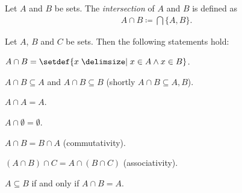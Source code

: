 \begin{definition}
    Let $A$ and $B$ be sets. The \emph{intersection} of $A$ and $B$ is defined as \begin{align}A\cap B\coloneq \bigcap\{A,B\}.\end{align}
\end{definition}

\begin{theorem}\label{theorem:sets:intersection_pair_properties}
    Let $A$, $B$ and $C$ be sets. Then the following statements hold:
    \begin{intheoremenumerate}
        \item $A\cap B=\setdef{x\given x\in A\land x\in B}$.
        \item\label{theorem:sets:intersection_subsets} $A\cap B\subseteq A$ and $A\cap B\subseteq B$ (shortly $A\cap B\subseteq A,B$).
        \item $A\cap A=A$.
        \item\label{theorem:sets:intersection_emptyset} $A\cap\emptyset=\emptyset$.
        \item $A\cap B=B\cap A$ (commutativity).
        \item $(A\cap B)\cap C=A\cap (B\cap C)$ (associativity).
        \item\label{theorem:sets:intersection_absorbption} $A\subseteq B$ if and only if $A\cap B=A$.
    \end{intheoremenumerate}
\end{theorem}

